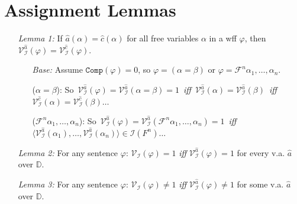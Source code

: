 \documentclass[a4paper, 11pt]{article} %
\newcommand{\tuple}[1]{\langle#1\rangle} %
\newcommand{\I}{\mathcal{I}}
\newcommand{\F}{\mathcal{F}}
\newcommand{\D}{\mathbb{D}}
\newcommand{\comp}{\texttt{Comp}}
\newcommand{\VV}[2]{\mathcal{V}_{#1}^{#2}} %
\begin{document}
\section*{Assignment Lemmas}

\begin{enumerate}
  \item[\it Lemma 1:] If $\hat{a}(\alpha)=\hat{c}(\alpha)$ for all free variables $\alpha$ in a wff $\varphi$, then $\VV{\I}{\hat{a}}(\varphi)=\VV{\I}{\hat{c}}(\varphi)$.
    \begin{itemize}
      \item[\it Base:] Assume $\comp(\varphi)=0$, so $\varphi=(\alpha=\beta)$ or $\varphi=\F^n\alpha_1,\ldots,\alpha_n$.
      \item[($\alpha=\beta$):] \mbox{So $\VV{\I}{\hat{a}}(\varphi)=\VV{\I}{\hat{a}}(\alpha=\beta)=1$ \textit{iff} $\VV{\I}{\hat{a}}(\alpha)=\VV{\I}{\hat{a}}(\beta)$ \textit{iff} $\VV{\I}{\hat{c}}(\alpha)=\VV{\I}{\hat{c}}(\beta)\ldots$}
      \item[($\F^n\alpha_1,\ldots,\alpha_n$):] \mbox{So $\VV{\I}{\hat{a}}(\varphi)=\VV{\I}{\hat{a}}(\F^n\alpha_1,\ldots,\alpha_n)=1$ \textit{iff} $\tuple{\VV{\I}{\hat{a}}(\alpha_1),\ldots,\VV{\I}{\hat{a}}(\alpha_n)}\in\I(F^n)\ldots$}
    \end{itemize}
  \item[\it Lemma 2:] For any sentence $\varphi$: $\VV{\I}{}(\varphi)= 1$ \textit{iff} $\VV{\I}{\hat{a}}(\varphi)= 1$ for every v.a. $\hat{a}$ over $\D$.
  \item[\it Lemma 3:] For any sentence $\varphi$: $\VV{\I}{}(\varphi)\neq1$ \textit{iff} $\VV{\I}{\hat{a}}(\varphi)\neq 1$ for some v.a. $\hat{a}$ over $\D$.
\end{enumerate}
\end{document}
